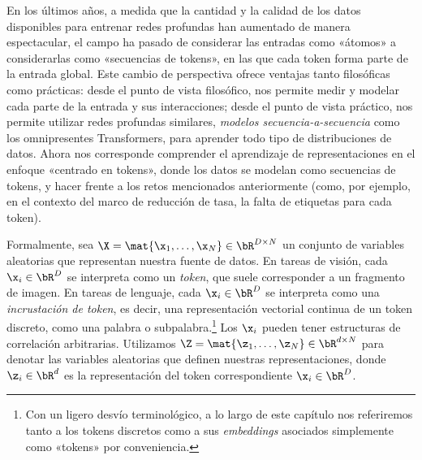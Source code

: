 \documentclass[../../book-main.tex]{subfiles}
\begin{document}
En los últimos años, a medida que la cantidad y la calidad de los datos
disponibles para entrenar redes profundas han aumentado de manera espectacular,
el campo ha pasado de considerar las entradas como «átomos» a considerarlas como
«secuencias de tokens», en las que cada token forma parte de la entrada global.
Este cambio de perspectiva ofrece ventajas tanto filosóficas como prácticas:
desde el punto de vista filosófico, nos permite medir y modelar cada
parte de la entrada y sus interacciones; desde el punto de vista práctico, nos permite
utilizar redes profundas similares, \textit{modelos secuencia-a-secuencia}
como los omnipresentes Transformers, para aprender todo tipo de
distribuciones de datos. Ahora nos corresponde comprender el aprendizaje de representaciones
en el enfoque «centrado en tokens», donde los datos se modelan como secuencias de tokens,
y hacer frente a los retos mencionados anteriormente (como, por ejemplo, en el
contexto del marco de reducción de tasa, la falta de etiquetas para cada token).

Formalmente, sea \(\X = \mat{\x_{1}, \dots, \x_{N}} \in \bR^{D \times
N}\) un conjunto de variables aleatorias que representan nuestra fuente de datos. En tareas de visión,
cada \(\x_{i} \in \bR^{D}\) se interpreta como un
\textit{token}, que suele corresponder a un fragmento de imagen. En
tareas de lenguaje, cada \(\x_{i} \in \bR^{D}\) se interpreta como una
\textit{incrustación de token}, es decir, una representación vectorial continua de
un token discreto, como una palabra o subpalabra.\footnote{Con un ligero
    desvío terminológico, a lo largo de este capítulo nos referiremos tanto a los tokens discretos como a sus
    \textit{embeddings} asociados simplemente como «tokens» por
conveniencia.}  %
Los \(\x_{i}\) pueden tener estructuras de correlación arbitrarias. Utilizamos
\(\Z = \mat{\z_{1}, \dots, \z_{N}} \in \bR^{d \times N}\) para denotar
las variables aleatorias que definen nuestras representaciones, donde \(\z_{i}
\in \bR^{d}\) es la representación del token correspondiente \(\x_i
\in \bR^{D}\).%
\end{document}
